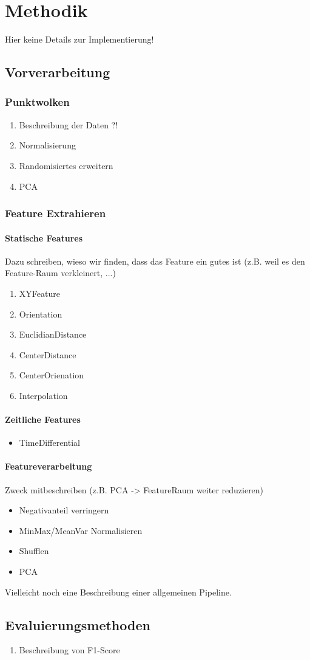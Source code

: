 \chapter{Methodik}
Hier keine Details zur Implementierung!
\section{Vorverarbeitung}
\subsection{Punktwolken}
\begin{enumerate}
  \item Beschreibung der Daten ?!
  \item Normalisierung
  \item Randomisiertes erweitern
  \item PCA
\end{enumerate}

\subsection{Feature Extrahieren}
\subsubsection{Statische Features}
Dazu schreiben, wieso wir finden, dass das Feature ein gutes ist (z.B. weil es den Feature-Raum verkleinert, ...)
\begin{enumerate}
  \item XYFeature
  \item Orientation
  \item EuclidianDistance
  \item CenterDistance
  \item CenterOrienation
  \item Interpolation
\end{enumerate}

\subsubsection{Zeitliche Features}
\begin{itemize}
\item TimeDifferential
\end{itemize}
\subsubsection{Featureverarbeitung}
Zweck mitbeschreiben (z.B. PCA -> FeatureRaum weiter reduzieren)
\begin{itemize}
  \item Negativanteil verringern
  \item MinMax/MeanVar Normalisieren
  \item Shufflen
  \item PCA
\end{itemize}

Vielleicht noch eine Beschreibung einer allgemeinen Pipeline.
\section{Evaluierungsmethoden}
\begin{enumerate}
  \item Beschreibung von F1-Score
\end{enumerate}
